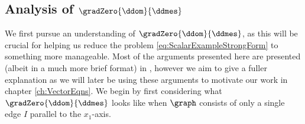 \subsection{Analysis of $\gradZero{\ddom}{\ddmes}$} \label{sec:GradZeroGraphAnalysis}
We first pursue an understanding of $\gradZero{\ddom}{\ddmes}$, as this will be crucial for helping us reduce the problem \eqref{eq:ScalarExampleStrongForm} to something more manageable.
Most of the arguments presented here are presented (albeit in a much more brief format) in \cite{zhikov2000extension}, however we aim to give a fuller explanation as we will later be using these arguments to motivate our work in chapter \ref{ch:VectorEqns}.
We begin by first considering what $\gradZero{\ddom}{\ddmes}$ looks like when $\graph$ consists of only a single edge $I$ parallel to the $x_1$-axis.


